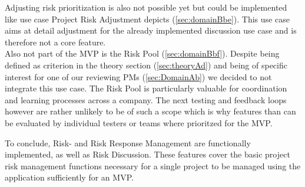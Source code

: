  Adjusting risk prioritization is also not possible yet but could be implemented like use case Project Risk Adjustment depicts (\ref{sec:domainBbe}). This use case aims at detail adjustment for the already implemented discussion use case and is therefore not a core feature.\\
 Also not part of the MVP is the Risk Pool (\ref{sec:domainBbf}). Despite being defined as criterion in the theory section (\ref{sec:theoryAd}) and being of specific interest for one of our reviewing PMs  (\ref{sec:DomainAb}) we decided to not integrate this use case. The Risk Pool is particularly valuable for coordination and learning processes across a company. The next testing and feedback loops however are rather unlikely to be of such a scope which is why features than can be evaluated by individual testers or teams where prioritzed for the \ac{MVP}.
 
 To conclude, Risk- and Risk Response Management are functionally implemented, as well as Risk Discussion. These features cover the basic project risk management functions necessary for a single project to be managed using the application sufficiently for an \ac{MVP}.
 